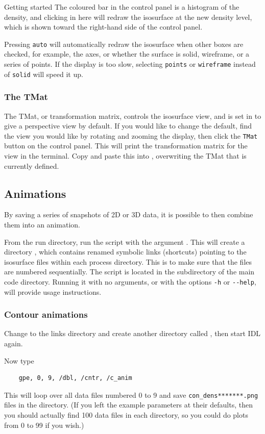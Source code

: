 \begin{chapter}{\label{cha:quickstart}Getting started}
  The coloured bar in the control panel is a histogram of the density, and
  clicking in here will redraw the isosurface at the new density level, which
  is shown toward the right-hand side of the control panel.

  Pressing \verb"auto" will automatically redraw the isosurface when other
  boxes are checked, for example, the axes, or whether the surface is solid,
  wireframe, or a series of points.  If the display is too slow, selecting
  \verb"points" or \verb"wireframe" instead of \verb"solid" will speed it up.

  \subsubsection{The TMat}
  The TMat, or transformation matrix, controls the isosurface view, and is set
  in  to give a perspective view by default.  If you would
  like to change the default, find the view you would like by rotating and
  zooming the display, then click the \verb"TMat" button on the control panel.
  This will print the transformation matrix for the view in the terminal.  Copy
  and paste this into , overwriting the TMat that is currently
  defined.

  \subsection{Animations}
  By saving a series of snapshots of 2D or 3D data, it is possible to then
  combine them into an animation.

  From the run directory, run the script  with the
  argument .  This will create a directory ,
  which contains renamed symbolic links (shortcuts) pointing to the isosurface
  files within each process directory.  This is to make sure that the files are
  numbered sequentially.  The  script is located in the
   subdirectory of the main code directory.  Running it  with
  no arguments, or with the options \verb"-h" or \verb"--help", will provide
  usage instructions.

  \subsubsection{Contour animations}
  Change to the links directory and create another directory called
  , then start IDL again.

  Now type
  \begin{Verbatim}
    gpe, 0, 9, /dbl, /cntr, /c_anim
  \end{Verbatim}
  This will loop over all data files numbered 0 to 9 and save
  \verb"con_dens*******.png" files in the  directory.  (If you
  left the  example parameters at their defaults, then you
  should actually find 100 data files in each  directory, so you
  could do plots from 0 to 99 if you wish.)


\end{chapter}
